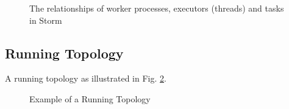 \documentclass[9pt,twocolumn,twoside]{styles/osajnl}
\begin{document}
\begin{figure}[htbp]
	\centering
	\caption{The relationships of worker processes, executors
          (threads) and tasks in Storm
          \cite{www-noll2012-parallelismofstormtopology} }
	\label{fig:Storm_worker-processes_executors_tasks}
\end{figure}


\subsection{Running Topology}
A running topology as illustrated in
Fig. \ref{fig:Storm_example_of_a_running_topology}.

\begin{figure}[htbp]
	\centering
	\caption{Example of a Running Topology
	\cite{www-noll2012-parallelismofstormtopology} }
	\label{fig:Storm_example_of_a_running_topology}
\end{figure}
\end{document}
